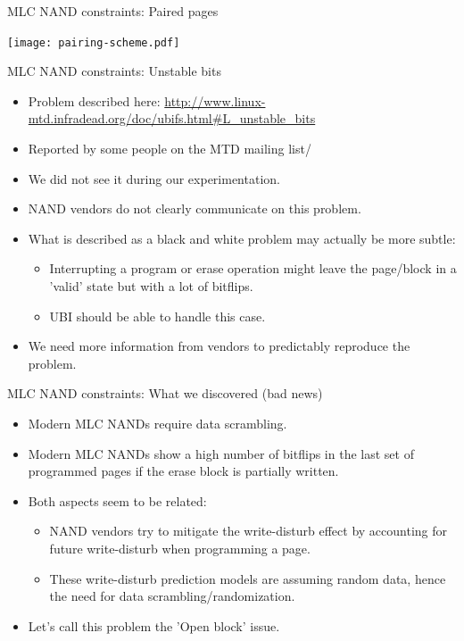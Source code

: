 \documentclass[aspectratio=169,obeyspaces,spaces,hyphens,dvipsnames]{beamer}
\begin{document}
\begin{frame}{MLC NAND constraints: Paired pages}
  \begin{center}
    \texttt{[image: pairing-scheme.pdf]}
  \end{center}
\end{frame}

\begin{frame}{MLC NAND constraints: Unstable bits}
  \begin{itemize}
  \item Problem described here:
	\url{http://www.linux-mtd.infradead.org/doc/ubifs.html\#L_unstable_bits}
  \item Reported by some people on the MTD mailing list/
  \item We did not see it during our experimentation.
  \item NAND vendors do not clearly communicate on this problem.
  \item What is described as a black and white problem may actually
	be more subtle:
    \begin{itemize}
    \item Interrupting a program or erase operation might leave the
	  page/block in a 'valid' state but with a lot of bitflips.
    \item UBI should be able to handle this case.
    \end{itemize}
  \item We need more information from vendors to predictably reproduce
	the problem.
  \end{itemize}
\end{frame}


\begin{frame}{MLC NAND constraints: What we discovered (bad news)}
  \begin{itemize}
  \item Modern MLC NANDs require data scrambling.
  \item Modern MLC NANDs show a high number of bitflips in the last
	set of programmed pages if the erase block is partially
	written.
  \item Both aspects seem to be related:
    \begin{itemize}
    \item NAND vendors try to mitigate the write-disturb effect by
	  accounting for future write-disturb when programming a page.
    \item These write-disturb prediction models are assuming random
	  data, hence the need for data scrambling/randomization.
    \end{itemize}
  \item Let's call this problem the 'Open block' issue.
  \end{itemize}
\end{frame}
\end{document}

